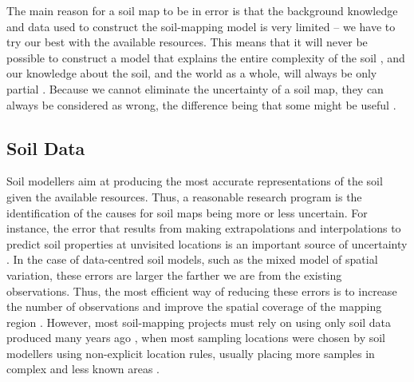 The main reason for a soil map to be in error is that the background knowledge and data used to
construct the soil-mapping model is very limited -- we have to try our best with the available
resources. This means that it will never be possible to construct a model that explains the entire complexity 
of
the soil \cite{Tukey1997}, and our knowledge about the soil, and the world as a whole,
will always be only partial \cite{Box1993}. Because we cannot eliminate the uncertainty of a soil
map, they can always be considered as wrong, the difference being that some might be useful
\cite{Box1976}.

\subsection{Soil Data}

Soil modellers aim at producing the most accurate representations of the soil given the
available resources. Thus, a reasonable research program is the identification of the causes for
soil maps being more or less uncertain. For instance, the error that results from making
extrapolations and interpolations to predict soil properties at unvisited locations is an
important source of uncertainty \cite{HeuvelinkEtAl1999, RefsgaardEtAl2006}. In the case of
data-centred soil models, such as the mixed model of spatial variation, these errors are
larger the farther we are from the existing observations. Thus, the most efficient way of reducing
these errors is to increase the number of observations and improve the spatial coverage of the mapping
region \cite{BrusEtAl2007a}. However, most soil-mapping projects must rely on using only soil
data produced many years ago \cite{KempenEtAl2009, HenglEtAl2014, PoggioEtAl2014, 
NussbaumEtAl2014, MulderEtAl2016}, when most sampling locations were chosen by soil 
modellers using non-explicit location rules, usually placing more samples in complex and
less known areas \cite{Rossiter2000}.

